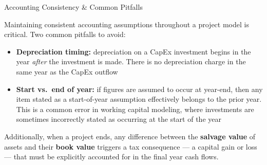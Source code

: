 \documentclass[10pt]{article}
\begin{document}
    \begin{core}{Accounting Consistency \& Common Pitfalls}

      Maintaining consistent accounting assumptions throughout a project model is critical. Two common pitfalls to avoid:

      \begin{itemize}

        \item \textbf{Depreciation timing:} depreciation on a CapEx investment begins in the year \textit{after} the investment is made. There is no depreciation charge in the same year as the CapEx outflow

        \item \textbf{Start vs.\ end of year:} if figures are assumed to occur at year-end, then any item stated as a start-of-year assumption effectively belongs to the prior year. This is a common error in working capital modeling, where investments are sometimes incorrectly stated as occurring at the start of the year

      \end{itemize}

      Additionally, when a project ends, any difference between the \textbf{salvage value} of assets and their \textbf{book value} triggers a tax consequence — a capital gain or loss — that must be explicitly accounted for in the final year cash flows.


    \end{core}
\end{document}
